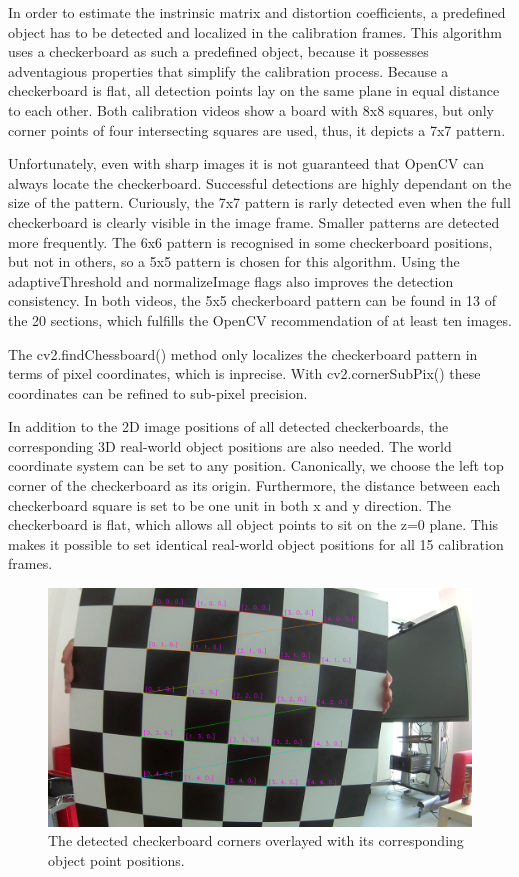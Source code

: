 \documentclass[bibliography=totoc]{scrartcl}
\begin{document}
In order to estimate the instrinsic matrix and distortion coefficients, a predefined object has to be detected and localized in the calibration frames.
This algorithm uses a checkerboard as such a predefined object, because it possesses adventagious properties that simplify the calibration process.
Because a checkerboard is flat, all detection points lay on the same plane in equal distance to each other.
Both calibration videos show a board with 8x8 squares, but only corner points of four intersecting squares are used, thus, it depicts a 7x7 pattern.

Unfortunately, even with sharp images it is not guaranteed that OpenCV can always locate the checkerboard.
Successful detections are highly dependant on the size of the pattern. 
Curiously, the 7x7 pattern is rarly detected even when the full checkerboard is clearly visible in the image frame.
Smaller patterns are detected more frequently.
The 6x6 pattern is recognised in some checkerboard positions, but not in others, so a 5x5 pattern is chosen for this algorithm.
Using the adaptiveThreshold and normalizeImage flags also improves the detection consistency.
In both videos, the 5x5 checkerboard pattern can be found in 13 of the 20 sections, which fulfills the OpenCV recommendation of at least ten images.

The cv2.findChessboard() method only localizes the checkerboard pattern in terms of pixel coordinates, which is inprecise.
With cv2.cornerSubPix() these coordinates can be refined to sub-pixel precision.

In addition to the 2D image positions of all detected checkerboards, the corresponding 3D real-world object positions are also needed.
The world coordinate system can be set to any position. 
Canonically, we choose the left top corner of the checkerboard as its origin.
Furthermore, the distance between each checkerboard square is set to be one unit in both x and y direction. 
The checkerboard is flat, which allows all object points to sit on the z=0 plane.
This makes it possible to set identical real-world object positions for all 15 calibration frames.

\begin{figure}[ht!]
	\centering
	\includegraphics[width=\linewidth]{imgs/labeled_checkerboard.png}
	\caption{The detected checkerboard corners overlayed with its corresponding object point positions.}
	\label{fig:labeled_checkerboard}
\end{figure}
\end{document}
